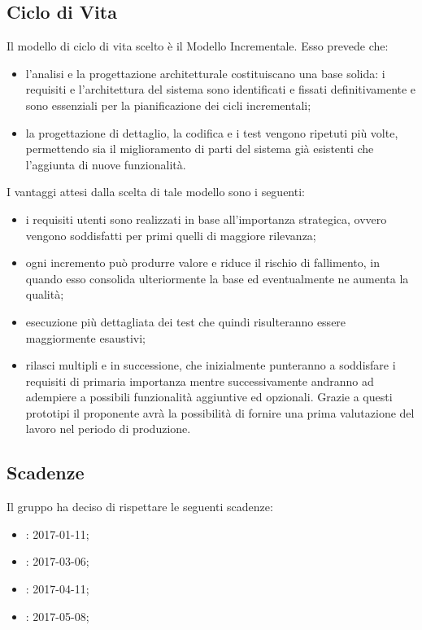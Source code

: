 	    \subsection{Ciclo di Vita}
	    Il modello di ciclo di vita scelto è il Modello Incrementale. Esso prevede che:
	    \begin{itemize}
	    	\item l'analisi e la progettazione architetturale costituiscano una base solida: i requisiti e l'architettura del sistema sono identificati e fissati definitivamente e sono essenziali per la pianificazione dei cicli incrementali;
	    	\item la progettazione di dettaglio, la codifica e i test vengono ripetuti più volte, permettendo sia il miglioramento di parti del sistema già esistenti che l'aggiunta di nuove funzionalità.
	    \end{itemize}
	    I vantaggi attesi dalla scelta di tale modello sono i seguenti:
	    \begin{itemize}
	    	\item i requisiti utenti sono realizzati in base all'importanza strategica, ovvero vengono soddisfatti per primi quelli di maggiore rilevanza;
	    	\item ogni incremento può produrre valore e riduce il rischio di fallimento, in quando esso consolida ulteriormente la base ed eventualmente ne aumenta la qualità;
	    	\item esecuzione più dettagliata dei test che quindi risulteranno essere maggiormente esaustivi;
	    	\item rilasci multipli e in successione, che inizialmente punteranno a soddisfare i requisiti di primaria importanza mentre successivamente andranno ad adempiere a possibili funzionalità aggiuntive ed opzionali. Grazie a questi prototipi il proponente avrà la possibilità di fornire una prima valutazione del lavoro nel periodo di produzione.
	    \end{itemize}
	    \subsection{Scadenze}
	    Il gruppo \AUTORE{} ha deciso di rispettare le seguenti scadenze:
	    \begin{itemize}
			\item \RR{}: 2017-01-11;
			\item \RP{}: 2017-03-06;
			\item \RQ{}: 2017-04-11;
			\item \RA{}: 2017-05-08;
	    \end{itemize}